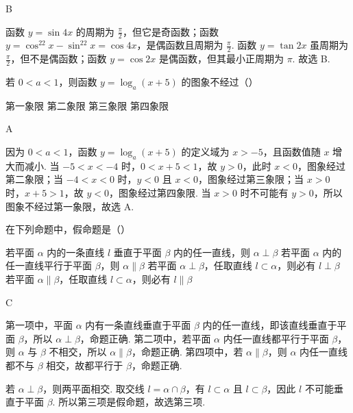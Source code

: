 \documentclass[UTF8,a4paper,oneside,11pt]{ctexbook}
\begin{document}
\begin{answer}
B
\end{answer}

\begin{solution}
函数 \(y=\sin4x\) 的周期为 \(\frac\pi2\)，但它是奇函数；函数
\(y=\cos^22x-\sin^22x=\cos4x\)，是偶函数且周期为 \(\frac\pi2\). 函数 \(y=\tan2x\) 虽周期为 \(\frac\pi2\)，但不是偶函数；函数 \(y=\cos2x\) 是偶函数，但其最小正周期为 \(\pi\). 故选 B.
\end{solution}

\begin{problem}
若 \(0 < a < 1\)，则函数 \(y = \log_a(x + 5)\) 的图象不经过（\quad）

\choices
    {第一象限}
    {第二象限}
    {第三象限}
    {第四象限}
\end{problem}

\begin{answer}
A
\end{answer}

\begin{solution}
因为 \(0<a<1\)，函数 \(y=\log_a(x+5)\) 的定义域为 \(x>-5\)，且函数值随 \(x\) 增大而减小. 当 \(-5<x<-4\) 时，\(0<x+5<1\)，故 \(y>0\)，此时 \(x<0\)，图象经过第二象限；当 \(-4<x<0\) 时，\(y<0\) 且 \(x<0\)，图象经过第三象限；当 \(x>0\) 时，\(x+5>1\)，故 \(y<0\)，图象经过第四象限. 当 \(x>0\) 时不可能有 \(y>0\)，所以图象不经过第一象限，故选 A.
\end{solution}

\begin{problem}
在下列命题中，假命题是（\quad）

\choices
    {若平面 \(\alpha \) 内的一条直线 \(l\) 垂直于平面 \(\beta \) 内的任一直线，则 \(\alpha \perp \beta \)}
    {若平面 \(\alpha \) 内的任一直线平行于平面 \(\beta \)，则 \(\alpha \parallel \beta \)}
    {若平面 \(\alpha \perp \beta \)，任取直线 \(l \subset \alpha \)，则必有 \(l \perp \beta \)}
    {若平面 \(\alpha \parallel \beta\)，任取直线 \(l \subset \alpha\)，则必有 \(l \parallel \beta\)}
\end{problem}

\begin{answer}
C
\end{answer}

\begin{solution}
第一项中，平面 \(\alpha\) 内有一条直线垂直于平面 \(\beta\) 内的任一直线，即该直线垂直于平面 \(\beta\)，所以 \(\alpha\perp\beta\)，命题正确. 第二项中，若平面 \(\alpha\) 内任一直线都平行于平面 \(\beta\)，则 \(\alpha\) 与 \(\beta\) 不相交，所以 \(\alpha\parallel\beta\)，命题正确. 第四项中，若 \(\alpha\parallel\beta\)，则 \(\alpha\) 内任一直线都不与 \(\beta\) 相交，故都平行于 \(\beta\)，命题正确.

若 \(\alpha\perp\beta\)，则两平面相交. 取交线 \(l=\alpha\cap\beta\)，有 \(l\subset\alpha\) 且 \(l\subset\beta\)，因此 \(l\) 不可能垂直于平面 \(\beta\). 所以第三项是假命题，故选第三项.
\end{solution}
\end{document}
